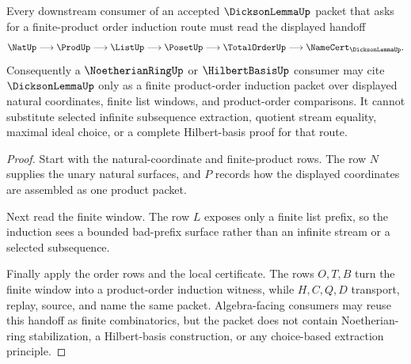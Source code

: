 \begin{theorem}\label{thm:dickson-lemma-finite-product-order-handoff}
Every downstream consumer of an accepted $\DicksonLemmaUp$ packet that asks for a finite-product order induction route must read the displayed handoff
$$
\NatUp \longrightarrow \ProdUp \longrightarrow \ListUp \longrightarrow \PosetUp \longrightarrow \TotalOrderUp \longrightarrow \NameCert_{\DicksonLemmaUp}.
$$
Consequently a $\NoetherianRingUp$ or $\HilbertBasisUp$ consumer may cite $\DicksonLemmaUp$ only as a finite product-order induction packet over displayed natural coordinates, finite list windows, and product-order comparisons. It cannot substitute selected infinite subsequence extraction, quotient stream equality, maximal ideal choice, or a complete Hilbert-basis proof for that route.
\end{theorem}
\begin{proof}
Start with the natural-coordinate and finite-product rows. The row $N$ supplies the unary natural surfaces, and $P$ records how the displayed coordinates are assembled as one product packet.

Next read the finite window. The row $L$ exposes only a finite list prefix, so the induction sees a bounded bad-prefix surface rather than an infinite stream or a selected subsequence.

Finally apply the order rows and the local certificate. The rows $O,T,B$ turn the finite window into a product-order induction witness, while $H,C,Q,D$ transport, replay, source, and name the same packet. Algebra-facing consumers may reuse this handoff as finite combinatorics, but the packet does not contain Noetherian-ring stabilization, a Hilbert-basis construction, or any choice-based extraction principle.
\end{proof}



